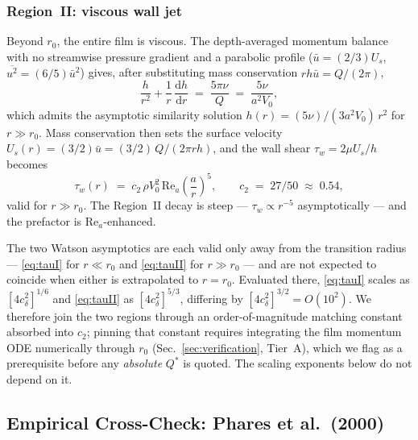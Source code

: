 \documentclass[aps,prfluids,reprint,amsmath,amssymb,floatfix]{revtex4-2}
\newcommand{\Rey}{\mathrm{Re}}
\newcommand{\dd}{\mathrm{d}}
\begin{document}
\subsubsection{Region~II: viscous wall jet}

Beyond $r_0$, the entire film is viscous. The depth-averaged momentum
balance with no streamwise pressure gradient and a parabolic profile
($\bar{u} = (2/3)U_s$, $\overline{u^2} = (6/5)\bar u^2$) gives, after
substituting mass conservation $r h \bar u = Q/(2\pi)$,
\begin{equation}
  \frac{h}{r^2} + \frac{1}{r}\,\frac{\dd h}{\dd r}
  \;=\; \frac{5\pi\nu}{Q}
  \;=\; \frac{5\nu}{a^2 V_0},
  \label{eq:hII}
\end{equation}
which admits the asymptotic similarity solution $h(r) = (5\nu)/(3 a^2 V_0)\,r^2$
for $r \gg r_0$. Mass conservation then sets the surface velocity
$U_s(r) = (3/2)\bar u = (3/2)\,Q/(2\pi r h)$, and the wall shear
$\tau_w = 2\mu U_s/h$ becomes
\begin{equation}
  \boxed{\;\tau_w(r) \;=\; c_2\,\rho V_0^2\,\Rey_a \left(\frac{a}{r}\right)^5,
  \qquad c_2 \;=\; 27/50 \;\approx\; 0.54,\;}
  \label{eq:tauII}
\end{equation}
valid for $r \gg r_0$. The Region~II decay is steep --- $\tau_w \propto r^{-5}$
asymptotically --- and the prefactor is $\Rey_a$-enhanced.

The two Watson asymptotics are each valid only away from the transition radius ---
\eqref{eq:tauI} for $r \ll r_0$ and \eqref{eq:tauII} for $r \gg r_0$ --- and are not
expected to coincide when either is extrapolated to $r = r_0$. Evaluated there,
\eqref{eq:tauI} scales as $[4 c_\delta^2]^{1/6}$ and \eqref{eq:tauII} as
$[4 c_\delta^2]^{5/3}$, differing by $[4 c_\delta^2]^{3/2} = O(10^2)$. We therefore
join the two regions through an order-of-magnitude matching constant absorbed into
$c_2$; pinning that constant requires integrating the film momentum ODE numerically
through $r_0$ (Sec.~\ref{sec:verification}, Tier~A), which we flag as a prerequisite
before any \emph{absolute} $Q^*$ is quoted. The scaling exponents below do not depend
on it.

\subsection{Empirical Cross-Check: Phares et al.~(2000)}
\end{document}

